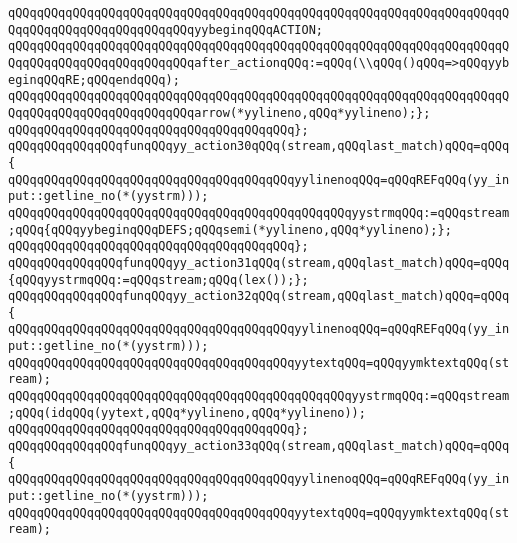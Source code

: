 \verb|qQQqqQQqqQQqqQQqqQQqqQQqqQQqqQQqqQQqqQQqqQQqqQQqqQQqqQQqqQQqqQQqqQQqqQQqqQQqqQQqqQQqqQQqqQQqqQQqyybeginqQQqACTION;|\newline
\verb|qQQqqQQqqQQqqQQqqQQqqQQqqQQqqQQqqQQqqQQqqQQqqQQqqQQqqQQqqQQqqQQqqQQqqQQqqQQqqQQqqQQqqQQqqQQqqQQqafter_actionqQQq:=qQQq(\\qQQq()qQQq=>qQQqyybeginqQQqRE;qQQqendqQQq);|\newline
\verb|qQQqqQQqqQQqqQQqqQQqqQQqqQQqqQQqqQQqqQQqqQQqqQQqqQQqqQQqqQQqqQQqqQQqqQQqqQQqqQQqqQQqqQQqqQQqqQQqarrow(*yylineno,qQQq*yylineno);};|\newline
\verb|qQQqqQQqqQQqqQQqqQQqqQQqqQQqqQQqqQQqqQQq};|\newline
\verb|qQQqqQQqqQQqqQQqfunqQQqyy_action30qQQq(stream,qQQqlast_match)qQQq=qQQq{|\newline
\verb|qQQqqQQqqQQqqQQqqQQqqQQqqQQqqQQqqQQqqQQqyylinenoqQQq=qQQqREFqQQq(yy_input::getline_no(*(yystrm)));|\newline
\newline
\verb|qQQqqQQqqQQqqQQqqQQqqQQqqQQqqQQqqQQqqQQqqQQqqQQqyystrmqQQq:=qQQqstream;qQQq{qQQqyybeginqQQqDEFS;qQQqsemi(*yylineno,qQQq*yylineno);};|\newline
\verb|qQQqqQQqqQQqqQQqqQQqqQQqqQQqqQQqqQQqqQQq};|\newline
\verb|qQQqqQQqqQQqqQQqfunqQQqyy_action31qQQq(stream,qQQqlast_match)qQQq=qQQq{qQQqyystrmqQQq:=qQQqstream;qQQq(lex());};|\newline
\verb|qQQqqQQqqQQqqQQqfunqQQqyy_action32qQQq(stream,qQQqlast_match)qQQq=qQQq{|\newline
\verb|qQQqqQQqqQQqqQQqqQQqqQQqqQQqqQQqqQQqqQQqyylinenoqQQq=qQQqREFqQQq(yy_input::getline_no(*(yystrm)));|\newline
\verb|qQQqqQQqqQQqqQQqqQQqqQQqqQQqqQQqqQQqqQQqyytextqQQq=qQQqyymktextqQQq(stream);|\newline
\newline
\verb|qQQqqQQqqQQqqQQqqQQqqQQqqQQqqQQqqQQqqQQqqQQqqQQqyystrmqQQq:=qQQqstream;qQQq(idqQQq(yytext,qQQq*yylineno,qQQq*yylineno));|\newline
\verb|qQQqqQQqqQQqqQQqqQQqqQQqqQQqqQQqqQQqqQQq};|\newline
\verb|qQQqqQQqqQQqqQQqfunqQQqyy_action33qQQq(stream,qQQqlast_match)qQQq=qQQq{|\newline
\verb|qQQqqQQqqQQqqQQqqQQqqQQqqQQqqQQqqQQqqQQqyylinenoqQQq=qQQqREFqQQq(yy_input::getline_no(*(yystrm)));|\newline
\verb|qQQqqQQqqQQqqQQqqQQqqQQqqQQqqQQqqQQqqQQqyytextqQQq=qQQqyymktextqQQq(stream);|\newline

